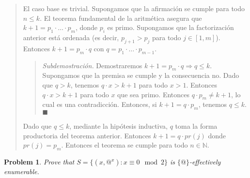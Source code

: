 \documentclass[a4paper, 12pt]{article}
\newtheorem{problem}{Problem}
\newtheorem{problem}{Problem}
\begin{document}
\small
\begin{quote}




El caso base es trivial. Supongamos que la afirmación se cumple para todo $n \leq k$. El
teorema fundamental de la aritmética asegura que $k + 1 = p_1 \cdot \ldots \cdot
p_m$, donde $p_i$ es primo. Supongamos que la factorización anterior está ordenada (es decir,
$p_{j + 1} > p_j$ para todo $j \in [1, m]$). Entonces $k + 1 = p_m \cdot q$ con $q =
p_1 \cdot \ldots \cdot p_{m - 1}$.

\footnotesize
\begin{quote}
\textit{Subdemostración.} Demostraremos $k + 1 = p_m \cdot q \Rightarrow q \leq k$.
Supongamos que la premisa se cumple y la consecuencia no. Dado que $q > k$, tenemos
$q \cdot x > k + 1$ para todo $x > 1$. Entonces $q \cdot x > k + 1$ para todo $x$
que sea primo. Entonces $q \cdot p_m \neq k + 1$, lo cual es una contradicción. Entonces,
si $k + 1 = q \cdot p_m$, tenemos $q \leq k$. $\blacksquare$
\end{quote}
\small

Dado que $q \leq k$, mediante la hipótesis inductiva, $q$ toma la forma productoria
del teorema anterior. Entonces $k + 1 = q \cdot pr(j)$ donde $pr(j) = p_m$. Entonces el
teorema se cumple para todo $n \in \mathbb{N}$.

\end{quote}
\normalsize

\begin{problem}
    Prove that $S = \{(x, @^x) : x \equiv 0 \mod 2\}$ is $\{@\}$-effectively
    enumerable.
\end{problem}
\end{document}
